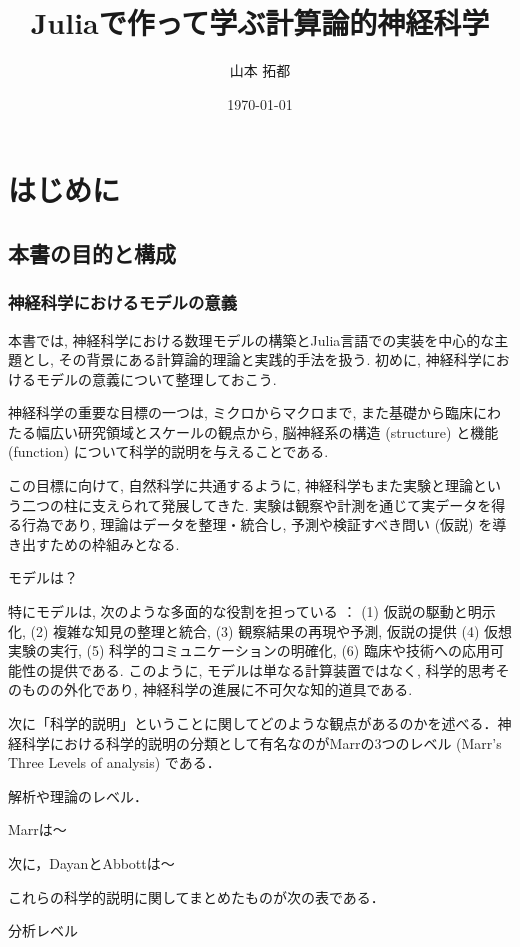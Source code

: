 \documentclass[titlepage]{ltjsbook}
\title{\Huge \textbf{Juliaで作って学ぶ計算論的神経科学}}
\author{\huge 山本 拓都}
\date{\huge \today}
\begin{document}
\setcounter{tocdepth}{2}
\tableofcontents
\clearpage
\chapter{はじめに}
\section{本書の目的と構成}
\subsection{神経科学におけるモデルの意義}
本書では, 神経科学における数理モデルの構築とJulia言語での実装を中心的な主題とし, その背景にある計算論的理論と実践的手法を扱う. 初めに, 神経科学におけるモデルの意義について整理しておこう. 

神経科学の重要な目標の一つは, ミクロからマクロまで, また基礎から臨床にわたる幅広い研究領域とスケールの観点から, 脳神経系の構造 (structure) と機能 (function) について科学的説明を与えることである. 

この目標に向けて, 自然科学に共通するように, 神経科学もまた実験と理論という二つの柱に支えられて発展してきた. 実験は観察や計測を通じて実データを得る行為であり, 理論はデータを整理・統合し, 予測や検証すべき問い (仮説) を導き出すための枠組みとなる. 

モデルは？

特にモデルは, 次のような多面的な役割を担っている \citep{Blohm2020-vc,levenstein2023role,van2024critical}：
 (1) 仮説の駆動と明示化, (2) 複雑な知見の整理と統合, (3) 観察結果の再現や予測, 仮説の提供 (4) 仮想実験の実行, (5) 科学的コミュニケーションの明確化, (6) 臨床や技術への応用可能性の提供である. このように, モデルは単なる計算装置ではなく, 科学的思考そのものの外化であり, 神経科学の進展に不可欠な知的道具である. 

次に「科学的説明」ということに関してどのような観点があるのかを述べる．神経科学における科学的説明の分類として有名なのがMarrの3つのレベル (Marr's Three Levels of analysis) \citep{Marr1982-wk} である．

解析や理論のレベル．

Marrは～

次に，DayanとAbbottは～

これらの科学的説明に関してまとめたものが次の表である．

分析レベル
\end{document}
